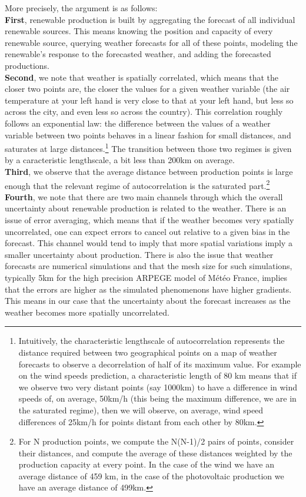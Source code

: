 More precisely, the argument is as follows: \\

\textbf{First}, renewable production is built by aggregating the forecast of all individual renewable sources. This means knowing the position and capacity of every renewable source, querying weather forecasts for all of these points, modeling the renewable's response to the forecasted weather, and adding the forecasted productions. \\

\textbf{Second}, we note that weather is spatially correlated, which means that the closer two points are, the closer the values for a given weather variable (the air temperature at your left hand is very close to that at your left hand, but less so across the city, and even less so across the country). This correlation roughly follows an exponential law: the difference between the values of a weather variable between two points behaves in a linear fashion for small distances, and saturates at large distances.\footnote{Intuitively, the characteristic lengthscale of autocorrelation represents the distance required between two geographical points on a map of weather forecasts to observe a decorrelation of half of its maximum value. For example on the wind speeds prediction, a characteristic length of 80 km means that if we observe two very distant points (say 1000km) to have a difference in wind speeds of, on average, 50km/h (this being the maximum difference, we are in the saturated regime), then we will observe, on average, wind speed differences of 25km/h for points distant from each other by 80km.} The transition between those two regimes is given by a caracteristic lengthscale, a bit less than 200km on average. \\

\textbf{Third}, we observe that the average distance between production points is large enough that the relevant regime of autocorrelation is the saturated part.\footnote{For N production points, we compute the N(N-1)/2 pairs of points, consider their distances, and compute the average of these distances weighted by the production capacity at every point. In the case of the wind we have an average distance of 459 km, in the case of the photovoltaic production we have an average distance of 499km.} \\

\textbf{Fourth}, we note that there are two main channels through which the overall uncertainty about renewable production is related to the weather. There is an issue of error averaging, which means that if the weather becomes very spatially uncorrelated, one can expect errors to cancel out relative to a given bias in the forecast. This channel would tend to imply that more spatial variations imply a smaller uncertainty about production. There is also the issue that weather forecasts are numerical simulations and that the mesh size for such simulations, typically 5km for the high precision ARPEGE model of Météo France, implies that the errors are higher as the simulated phenomenons have higher gradients. This means in our case that the uncertainty about the forecast increases as the weather becomes more spatially uncorrelated. \\

